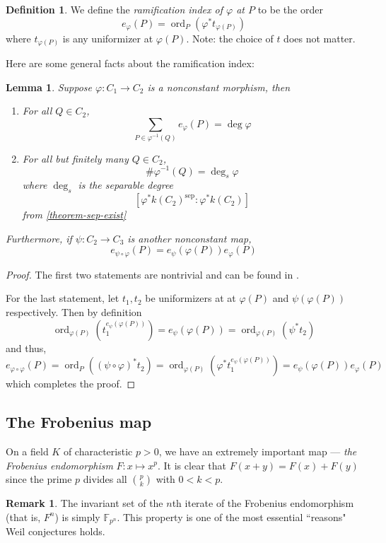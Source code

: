 \documentclass[12pt]{article}
\newtheorem{lemma}{Lemma}[subsection]
\theoremstyle{remark}
\theoremstyle{definition}
\newtheorem{remark}{Remark}[subsection]
\newtheorem{definition}{Definition}[subsection]
\newcommand{\ord}[0]{\operatorname{ord}}
\newcommand{\F}[0]{\mathbb{F}}
\begin{document}
        \begin{definition}
            We define the \textit{ramification index of $\varphi$ at $P$} to be the order
            \[e_\varphi(P)=\ord_P\left(\varphi^*t_{\varphi(P)}\right)\]
            where $t_{\varphi(P)}$ is any uniformizer at $\varphi(P)$. Note: the choice of $t$ does not matter.
        \end{definition}
        Here are some general facts about the ramification index:
        \begin{lemma}\label{lemma-rami}
            Suppose $\varphi:C_1\to C_2$ is a nonconstant morphism, then
            \begin{enumerate}[\normalfont(i)]
                \item For all $Q\in C_2$,
                \[\sum_{P\in\varphi^{-1}(Q)}e_{\varphi}(P)=\deg \varphi\]
                \item For all but finitely many $Q\in C_2$,
                \[\#\varphi^{-1}(Q)=\deg_s \varphi\]
                where $\deg_s$ is the separable degree
                \[[\varphi^*k(C_2)^{\mathrm{sep}}:\varphi^*k(C_2)]\]
                from \autoref{theorem-sep-exist}
            \end{enumerate}
            Furthermore, if $\psi:C_2\to C_3$ is another nonconstant map,
            \[e_{\psi\circ\varphi}(P)=e_{\psi}(\varphi(P))e_{\varphi}(P)\]
        \end{lemma}
        \begin{proof}
            The first two statements are nontrivial and can be found in \cite{hartshorne_2010_algebraic}.
            
            For the last statement, let $t_1,t_2$ be uniformizers at at $\varphi(P)$ and $\psi(\varphi(P))$ respectively. Then by definition
            \[\ord_{\varphi(P)}\left(t_1^{e_{\psi}(\varphi(P))}\right)=e_{\psi}(\varphi(P))=\ord_{\varphi(P)}(\psi^*t_2)\]
            and thus,
            \[e_{\varphi\circ\varphi}(P)=\ord_{P}((\psi\circ\varphi)^*t_2)=\ord_{\varphi(P)}(\varphi^*t_1^{e_{\psi}(\varphi(P))})=e_{\psi}(\varphi(P))e_{\varphi}(P)\]
            which completes the proof.
        \end{proof}
    \subsection{The Frobenius map}
        On a field $K$ of characteristic $p>0$, we have an extremely important map --- \textit{the Frobenius endomorphism} $F:x\mapsto x^p$. It is clear that $F(x+y)=F(x)+F(y)$ since the prime $p$ divides all $\binom{p}{k}$ with $0<k<p$.
        \begin{remark}
            The invariant set of the $n$th iterate of the Frobenius endomorphism (that is, $F^n$) is simply $\F_{p^n}$. This property is one of the most essential ``reasons" Weil conjectures holds. 
        \end{remark}
        
\end{document}
